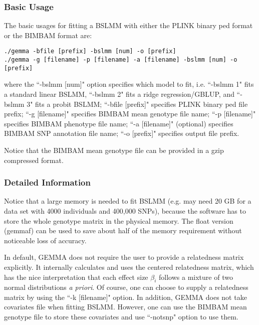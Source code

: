 \documentclass[11pt]{article}
\begin{document}
\subsubsection{Basic Usage}

The basic usages for fitting a BSLMM with either the PLINK binary ped
format or the BIMBAM format are:

\begin{verbatim}
./gemma -bfile [prefix] -bslmm [num] -o [prefix]
./gemma -g [filename] -p [filename] -a [filename] -bslmm [num] -o [prefix]
\end{verbatim}

where the ``-bslmm [num]" option specifies which model to fit,
i.e. ``-bslmm 1" fits a standard linear BSLMM, ``-bslmm 2" fits a
ridge regression/GBLUP, and ``-bslmm 3" fits a probit BSLMM; ``-bfile
[prefix]" specifies PLINK binary ped file prefix; ``-g [filename]"
specifies BIMBAM mean genotype file name; ``-p [filename]" specifies
BIMBAM phenotype file name; ``-a [filename]" (optional) specifies
BIMBAM SNP annotation file name; ``-o [prefix]" specifies output file
prefix.

Notice that the BIMBAM mean genotype file can be provided in a gzip
compressed format.

\subsubsection{Detailed Information}

Notice that a large memory is needed to fit BSLMM (e.g. may need 20 GB
for a data set with 4000 individuals and 400,000 SNPs), because the
software has to store the whole genotype matrix in the physical
memory. The float version (gemmaf) can be used to save about half of
the memory requirement without noticeable loss of accuracy.

In default, GEMMA does not require the user to provide a relatedness
matrix explicitly. It internally calculates and uses the centered
relatedness matrix, which has the nice interpretation that each effect
size $\beta_i$ follows a mixture of two normal distributions {\it a
  priori}. Of course, one can choose to supply a relatedness matrix by
using the ``-k [filename]" option. In addition, GEMMA does not take
covariates file when fitting BSLMM. However, one can use the BIMBAM
mean genotype file to store these covariates and use ``-notsnp" option
to use them.
\end{document}
